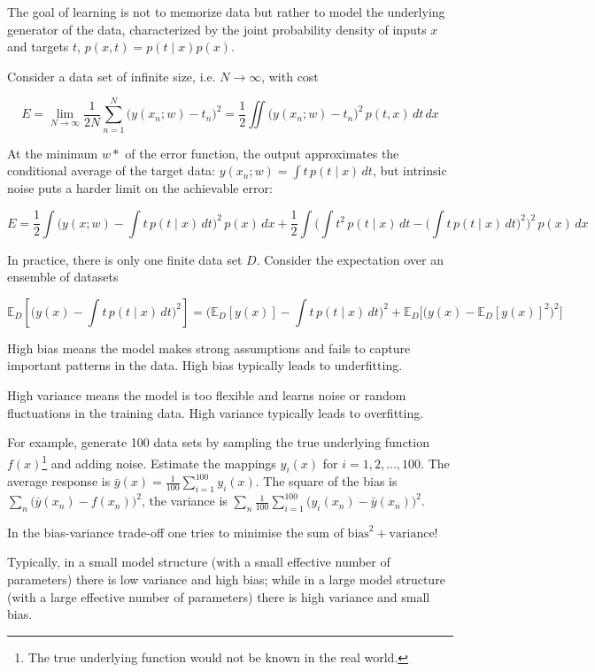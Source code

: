 The goal of learning is not to memorize data but rather to model the underlying
generator of the data, characterized by the joint probability density of inputs $x$ and targets $t$,
$p(x, t) = p(t \mid x) p(x)$.

Consider a data set of infinite size, i.e. $N \rightarrow \infty$, with cost

$$
E = \lim_{N \rightarrow \infty}{\frac{1}{2N} \sum_{n=1}^N{ \big(y(x_n; w) - t_n\big)^2 }}
= \frac{1}{2} \iint{ \big(y(x_n; w) - t_n\big)^2 \,  p(t, x) \, dt \, dx }
$$

At the minimum $w*$ of the error function,
the output approximates the conditional average of the target data:
$y(x_n; w) = \int{t \, p(t \mid x) \, dt}$,
but intrinsic noise puts a harder limit on the achievable error:

$$
E
= \frac{1}{2} \int{ \Big( y(x; w) - \int{t \, p(t \mid x) \, dt} \Big)^2 \, p(x) \, dx}
+ \frac{1}{2} \int{ \Big( \int{t^2 \, p(t \mid x) \, dt} - \big( \int{t \, p(t \mid x) \, dt} \big)^2 \Big)^2 \, p(x) \, dx}
$$

In practice, there is only one finite data set $D$. Consider the expectation over an ensemble of datasets

$$
\mathbb{E}_D[\big( y(x) - \int{t \, p(t \mid x) \, dt} \big)^2]
= \big( \mathbb{E}_D[y(x)] - \int{t \, p(t \mid x) \, dt} \big)^2
+ \mathbb{E}_D\Big[ \big( y(x) - \mathbb{E}_D[y(x)]^2 \big)^2 \Big]
$$

High bias means the model makes strong assumptions and fails to capture important patterns in the data.
High bias typically leads to underfitting.

High variance means the model is too flexible and learns noise or random fluctuations in the training data.
High variance typically leads to overfitting.

For example, generate 100 data sets by sampling the true underlying function $f(x)$\footnote{
    The true underlying function would not be known in the real world.
} and adding noise. Estimate the mappings $y_i(x)$ for $i = 1, 2, \dots, 100$.
The average response is $\bar{y}(x) = \frac{1}{100} \sum_{i=1}^{100}{y_i(x)}$.
The square of the bias is $\sum_n\big( \bar{y}(x_n) - f(x_n) \big)^2$,
the variance is $\sum_n{ \frac{1}{100} \sum_{i=1}^{100}{ \big( y_i(x_n) - \bar{y}(x_n) \big)^2 } }$.

In the bias-variance trade-off one tries to minimise the sum of $\text{bias}^2 + \text{variance}$!

Typically, in a small model structure (with a small effective number of parameters)
there is low variance and high bias; while in a large model structure
(with a large effective number of parameters) there is high variance and small bias.

